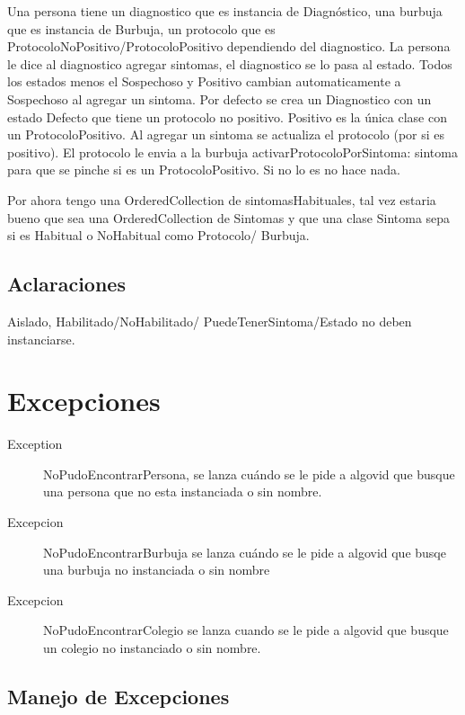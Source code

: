 \documentclass[titlepage,a4paper]{article}
\begin{document}
Una persona tiene un diagnostico que es instancia de Diagnóstico, una burbuja que es instancia de Burbuja, un protocolo que es ProtocoloNoPositivo/ProtocoloPositivo dependiendo del diagnostico.
La persona le dice al diagnostico agregar sintomas, el diagnostico se lo pasa al estado. Todos los estados menos el Sospechoso y Positivo cambian automaticamente a Sospechoso al agregar un sintoma.
Por defecto se crea un Diagnostico con un estado Defecto que tiene un protocolo no positivo.
Positivo es la única clase con un ProtocoloPositivo.
Al agregar un sintoma se actualiza el protocolo (por si es positivo). El protocolo le envia a la burbuja  
activarProtocoloPorSintoma: sintoma para que se pinche si es un ProtocoloPositivo. Si no lo es no hace nada. \newline



Por ahora tengo una OrderedCollection de sintomasHabituales, tal vez estaria bueno que sea una OrderedCollection de Sintomas y que una clase Sintoma sepa si es Habitual o NoHabitual como Protocolo/ Burbuja.

\subsection{Aclaraciones}
Aislado, Habilitado/NoHabilitado/ PuedeTenerSintoma/Estado no deben instanciarse.


\section{Excepciones}\label{sec:excepciones}

\begin{description}
\item[Exception]NoPudoEncontrarPersona, se lanza cuándo se le pide a algovid que busque una persona que no esta instanciada o sin nombre.
\item[Excepcion] NoPudoEncontrarBurbuja se lanza cuándo se le pide a algovid que busqe una burbuja no instanciada o sin nombre
\item[Excepcion] NoPudoEncontrarColegio se lanza cuando se le pide a algovid que busque un colegio no instanciado o sin nombre. 


\end{description}
\subsection{Manejo de Excepciones}
\end{document}
